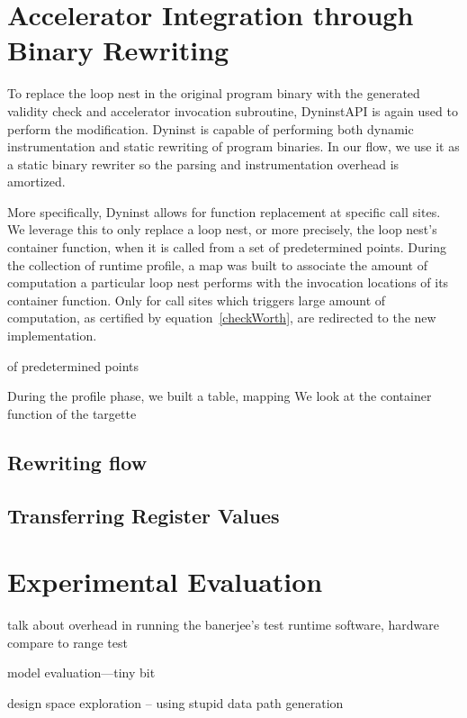 \section{Accelerator Integration through Binary Rewriting}
To replace the loop nest in the original program binary with the generated
validity check and accelerator invocation subroutine, DyninstAPI is again used to perform the modification. Dyninst is capable of performing both
dynamic instrumentation and static rewriting of program binaries. In our flow, we use it as a static binary rewriter so the parsing and instrumentation overhead is amortized.

More specifically, 
Dyninst allows for function replacement at specific call sites. We leverage this to only replace a loop nest, or more precisely, the loop nest's container function, when it is called from a set of predetermined points. 
During the collection of runtime profile, a map was built to associate the amount of computation a particular loop nest performs with the invocation locations of its container function. Only for call sites which triggers large amount of
computation, as certified by equation~\ref{checkWorth}, are redirected to the new implementation.   


of predetermined points

During the profile phase, we built a table, mapping 
We look at the container function of the targette
\subsection{Rewriting flow}



\subsection{Transferring Register Values}

\subsection{}


\section{Experimental Evaluation }
\label{biev}
talk about overhead in running the banerjee's test runtime
software, hardware
compare to range test

model evaluation---tiny bit


design space exploration -- using stupid data path generation







